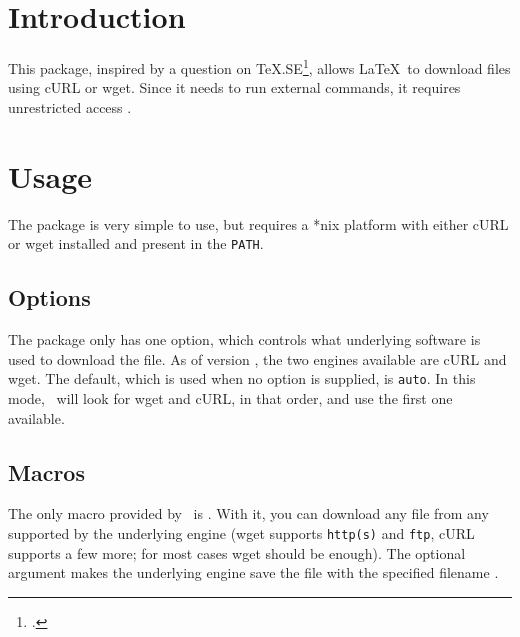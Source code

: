 \documentclass{skdoc}
\begin{document}

    \author{Simon Sigurdhsson}

    \maketitle
    \begin{abstract}
    The \thepackage\ allows \LaTeX\ to download files using cURL or wget.
    \end{abstract}

    \section{Introduction}
    This package, inspired by a question on \TeX.SE\footcite{Klinger12},
    allows \LaTeX\ to download files using cURL or wget. Since it needs
    to run external commands, it requires unrestricted 
    access . 

    \section{Usage}
    The package is very simple to use, but requires a *nix platform with
    either cURL or wget installed and present in the \texttt{PATH}.

    \subsection{Options}
    The package only has one option, which controls what underlying
    software is used to download the file. As of version \theversion,
    the two engines available are cURL and wget. The default, which is
    used when no option is supplied, is \texttt{auto}. In this mode,
    \thepkg\ will look for wget and cURL, in that order, and use the
    first one available.

    \subsection{Macros}
    \DescribeMacro{}
    The only macro provided by \thepkg\ is . With it, you
    can download any file from any  supported by the underlying
    engine (wget supports \texttt{http(s)} and \texttt{ftp}, cURL
    supports a few more; for most cases wget should be enough). The
    optional argument  makes the underlying engine save
    the file with the specified filename .
\end{document}
